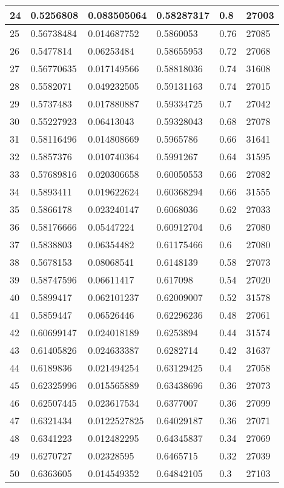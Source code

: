 \begin{longtable}{|l|l|l|l|l|l|}
24 & 0.5256808 & 0.083505064 & 0.58287317 & 0.8 & 27003 \\ \hline 
25 & 0.56738484 & 0.014687752 & 0.5860053 & 0.76 & 27085 \\ \hline 
26 & 0.5477814 & 0.06253484 & 0.58655953 & 0.72 & 27068 \\ \hline 
27 & 0.56770635 & 0.017149566 & 0.58818036 & 0.74 & 31608 \\ \hline 
28 & 0.5582071 & 0.049232505 & 0.59131163 & 0.74 & 27015 \\ \hline 
29 & 0.5737483 & 0.017880887 & 0.59334725 & 0.7 & 27042 \\ \hline 
30 & 0.55227923 & 0.06413043 & 0.59328043 & 0.68 & 27078 \\ \hline 
31 & 0.58116496 & 0.014808669 & 0.5965786 & 0.66 & 31641 \\ \hline 
32 & 0.5857376 & 0.010740364 & 0.5991267 & 0.64 & 31595 \\ \hline 
33 & 0.57689816 & 0.020306658 & 0.60050553 & 0.66 & 27082 \\ \hline 
34 & 0.5893411 & 0.019622624 & 0.60368294 & 0.66 & 31555 \\ \hline 
35 & 0.5866178 & 0.023240147 & 0.6068036 & 0.62 & 27033 \\ \hline 
36 & 0.58176666 & 0.05447224 & 0.60912704 & 0.6 & 27080 \\ \hline 
37 & 0.5838803 & 0.06354482 & 0.61175466 & 0.6 & 27080 \\ \hline 
38 & 0.5678153 & 0.08068541 & 0.6148139 & 0.58 & 27073 \\ \hline 
39 & 0.58747596 & 0.06611417 & 0.617098 & 0.54 & 27020 \\ \hline 
40 & 0.5899417 & 0.062101237 & 0.62009007 & 0.52 & 31578 \\ \hline 
41 & 0.5859447 & 0.06526446 & 0.62296236 & 0.48 & 27061 \\ \hline 
42 & 0.60699147 & 0.024018189 & 0.6253894 & 0.44 & 31574 \\ \hline 
43 & 0.61405826 & 0.024633387 & 0.6282714 & 0.42 & 31637 \\ \hline 
44 & 0.6189836 & 0.021494254 & 0.63129425 & 0.4 & 27058 \\ \hline 
45 & 0.62325996 & 0.015565889 & 0.63438696 & 0.36 & 27073 \\ \hline 
46 & 0.62507445 & 0.023617534 & 0.6377007 & 0.36 & 27099 \\ \hline 
47 & 0.6321434 & 0.0122527825 & 0.64029187 & 0.36 & 27071 \\ \hline 
48 & 0.6341223 & 0.012482295 & 0.64345837 & 0.34 & 27069 \\ \hline 
49 & 0.6270727 & 0.02328595 & 0.6465715 & 0.32 & 27039 \\ \hline 
50 & 0.6363605 & 0.014549352 & 0.64842105 & 0.3 & 27103 \\ \hline 
\end{longtable}
